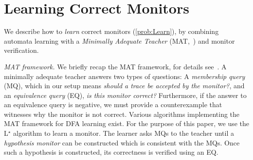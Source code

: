 \documentclass[runningheads]{llncs}
\newcommand{\sj}[2][]{\todo[color=red!50!white,#1]{\footnotesize{SJ: #2}}}
\renewcommand{\paragraph}[1]{\smallskip\noindent\emph{#1}}
\begin{document}
\section{Learning Correct Monitors}\label{sec:learning}
We describe how to \emph{learn} correct monitors (\cref{prob:Learn}), by combining automata learning  with a \emph{Minimally Adequate Teacher} (MAT,~\cite{DBLP:journals/iandc/Angluin87}) and monitor verification.

\paragraph{MAT framework.}
We briefly recap the MAT framework, for details see~\cite{DBLP:journals/cacm/Vaandrager17}.
A minimally adequate teacher answers two types of questions:
A \emph{membership query} (MQ), which in our setup means \emph{should a trace be accepted by the monitor?}, and an \emph{equivalence query} (EQ), \emph{is this monitor correct?}
Furthermore, if the answer to an equivalence query is negative, we must provide a counterexample that witnesses why the monitor is not correct.
Various algorithms implementing the MAT framework for DFA learning exist. For the purpose of this paper, we use the L$^{\star}$ algorithm \cite{DBLP:journals/iandc/Angluin87} to learn a monitor. The learner asks MQs to the teacher until a \emph{hypothesis monitor} can be constructed which is consistent with the MQs. Once such a hypothesis is constructed, its correctness is verified using an EQ.
\end{document}
